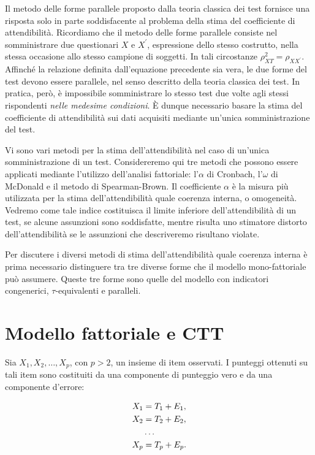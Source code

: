 \documentclass[
  11pt,
]{krantz}
\theoremstyle{definition}
\theoremstyle{definition}
\theoremstyle{definition}
\theoremstyle{definition}
\theoremstyle{remark}
\begin{document}
Il metodo delle forme parallele proposto dalla teoria classica dei test fornisce una risposta solo in parte soddisfacente al problema della stima del coefficiente di attendibilità. Ricordiamo che il metodo delle forme parallele consiste nel somministrare due questionari \(X\) e \(X^\prime\), espressione dello stesso costrutto, nella stessa occasione allo stesso campione di soggetti. In tali circostanze \(\rho^2_{XT} = \rho_{XX^\prime}\). Affinché la relazione definita dall'equazione precedente sia vera, le due forme del test devono essere parallele, nel senso descritto della teoria classica dei test. In pratica, però, è impossibile somministrare lo stesso test due volte agli stessi rispondenti \emph{nelle medesime condizioni}. È dunque necessario basare la stima del coefficiente di attendibilità sui dati acquisiti mediante un'unica somministrazione del test.

Vi sono vari metodi per la stima dell'attendibilità nel caso di un'unica somministrazione di un test. Considereremo qui tre metodi che possono essere applicati mediante l'utilizzo dell'analisi fattoriale: l'\(\alpha\) di Cronbach, l'\(\omega\) di McDonald e il metodo di Spearman-Brown. Il coefficiente \(\alpha\) è la misura più utilizzata per la stima dell'attendibilità quale coerenza interna, o omogeneità. Vedremo come tale indice costituisca il limite inferiore dell'attendibilità di un test, se alcune assunzioni sono soddisfatte, mentre risulta uno stimatore distorto dell'attendibilità se le assunzioni che descriveremo risultano violate.

Per discutere i diversi metodi di stima dell'attendibilità quale coerenza interna è prima necessario distinguere tra tre diverse forme che il modello mono-fattoriale può assumere. Queste tre forme sono quelle del modello con indicatori congenerici, \(\tau\)-equivalenti e paralleli.

\hypertarget{modello-fattoriale-e-ctt}{%
\section{Modello fattoriale e CTT}\label{modello-fattoriale-e-ctt}}

Sia \(X_1, X_2, \dots, X_p\), con \(p>2\), un insieme di item osservati. I punteggi ottenuti su tali item sono costituiti da una componente di punteggio vero e da una componente d'errore:

\begin{equation}
\begin{aligned}
X_1 &=T_1+E_1,\notag\\ 
X_2 &=T_2+E_2,\notag\\ 
&\dots\notag\\ 
X_p &=T_p+E_p.\notag
\end{aligned}
\end{equation}
\end{document}

